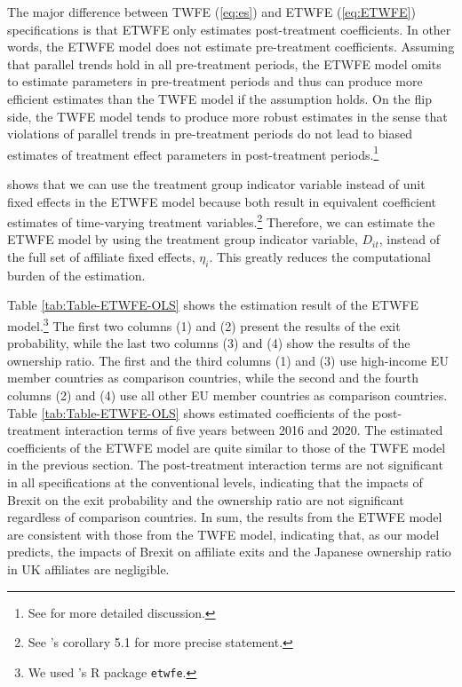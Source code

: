 \documentclass[preprint,11pt,authoryear]{elsarticle}
\begin{document}
The major difference between TWFE (\ref{eq:es}) and ETWFE (\ref{eq:ETWFE}) specifications is that ETWFE only estimates post-treatment coefficients.
In other words, the ETWFE model does not estimate pre-treatment coefficients. 
Assuming that parallel trends hold in all pre-treatment periods, the ETWFE model omits to estimate parameters in pre-treatment periods and thus can produce more efficient estimates than the TWFE model if the assumption holds.
On the flip side, the TWFE model tends to produce more robust estimates in the sense that violations of parallel trends in pre-treatment periods do not lead to biased estimates of treatment effect parameters in post-treatment periods.\footnote{See \cite{callaway2023difference} for more detailed discussion.}



\cite{wooldridge2021two} shows that we can use the treatment group indicator variable instead of unit fixed effects in the ETWFE model because both result in equivalent coefficient estimates of time-varying treatment variables.\footnote{See \cite{wooldridge2021two}'s corollary 5.1 for more precise statement.}
Therefore, we can estimate the ETWFE model by using the treatment group indicator variable, $D_{i t}$, instead of the full set of affiliate fixed effects, $\eta_{i}$.
This greatly reduces the computational burden of the estimation.


Table \ref{tab:Table-ETWFE-OLS} shows the estimation result of the ETWFE model.\footnote{We used \cite{etwfe}'s R package \texttt{etwfe}.} 
The first two columns (1) and (2) present the results of the exit probability, while the last two columns (3) and (4) show the results of the ownership ratio.
The first and the third columns (1) and (3) use high-income EU member countries as comparison countries, while the second and the fourth columns (2) and (4) use all other EU member countries as comparison countries.
Table \ref{tab:Table-ETWFE-OLS} shows estimated coefficients of the post-treatment interaction terms of five years between 2016 and 2020. 
The estimated coefficients of the ETWFE model are quite similar to those of the TWFE model in the previous section.
The post-treatment interaction terms are not significant in all specifications at the conventional levels, indicating that the impacts of Brexit on the exit probability and the ownership ratio are not significant regardless of comparison countries. 
In sum, the results from the ETWFE model are consistent with those from the TWFE model, indicating that, as our model predicts, the impacts of Brexit on affiliate exits and the Japanese ownership ratio in UK affiliates are negligible.
\end{document}
